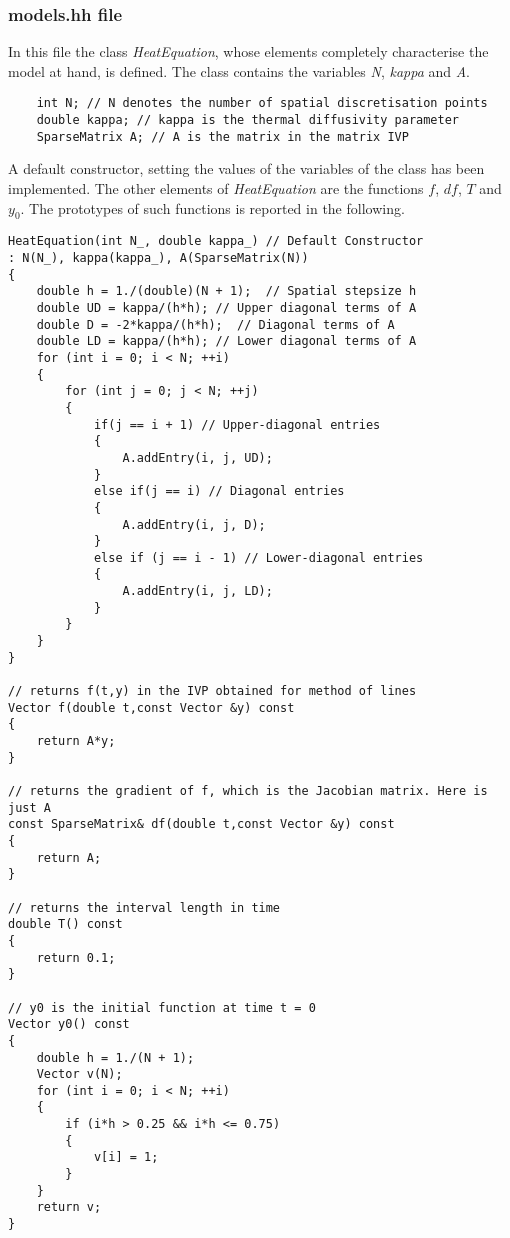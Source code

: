 \documentclass[11pt]{article}
\theoremstyle{theorem}
\theoremstyle{definition}
\begin{document}
\subsubsection{models.hh file}
\label{subsubsec:models}
In this file the class \emph{HeatEquation}, whose elements completely characterise the model at hand, is defined. 
The class contains the variables \emph{N}, \emph{kappa} and \emph{A}.\\


\begin{lstlisting}
	int N; // N denotes the number of spatial discretisation points
	double kappa; // kappa is the thermal diffusivity parameter
	SparseMatrix A; // A is the matrix in the matrix IVP
\end{lstlisting}

A default constructor, setting the values of the variables of the class has been implemented. The other elements of \emph{HeatEquation} are the functions $f$, $df$, $T$ and $y_0$. The prototypes of such functions is reported in the following.\\

\begin{lstlisting}
HeatEquation(int N_, double kappa_) // Default Constructor
: N(N_), kappa(kappa_), A(SparseMatrix(N))
{
	double h = 1./(double)(N + 1);  // Spatial stepsize h
	double UD = kappa/(h*h); // Upper diagonal terms of A
	double D = -2*kappa/(h*h);  // Diagonal terms of A
	double LD = kappa/(h*h); // Lower diagonal terms of A
	for (int i = 0; i < N; ++i)
	{
		for	(int j = 0; j < N; ++j)
		{
			if(j == i + 1) // Upper-diagonal entries
			{
				A.addEntry(i, j, UD);
			}
			else if(j == i) // Diagonal entries
			{
				A.addEntry(i, j, D);
			}
			else if (j == i - 1) // Lower-diagonal entries
			{
				A.addEntry(i, j, LD);
			}
		}
	}
}

// returns f(t,y) in the IVP obtained for method of lines
Vector f(double t,const Vector &y) const
{
	return A*y;
}

// returns the gradient of f, which is the Jacobian matrix. Here is just A
const SparseMatrix& df(double t,const Vector &y) const
{
	return A;
}

// returns the interval length in time
double T() const
{
	return 0.1;
}

// y0 is the initial function at time t = 0
Vector y0() const
{
	double h = 1./(N + 1);
	Vector v(N);
	for (int i = 0; i < N; ++i)
	{
		if (i*h > 0.25 && i*h <= 0.75)
		{
			v[i] = 1;
		}
	}
	return v;
}
\end{lstlisting}
\end{document}
